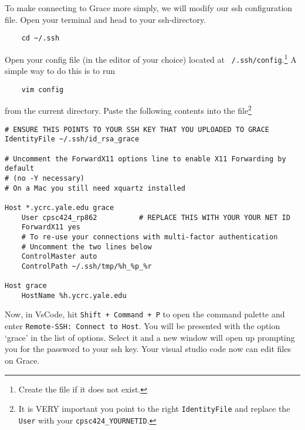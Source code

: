 \documentclass{article}
\begin{document}
To make connecting to Grace more simply, we will modify our ssh configuration file. 
Open your terminal and head to your ssh-directory.
\begin{verbatim}
    cd ~/.ssh
\end{verbatim}
Open your config file (in the editor of your choice) located at \texttt{~/.ssh/config}.\footnote{Create the file if it does not exist.}
A simple way to do this is to run 
\begin{verbatim}
    vim config
\end{verbatim}
from the current directory. Paste the following contents into the file\footnote{It is VERY important you point to the 
right \texttt{IdentityFile} and replace the \texttt{User} with your \texttt{cpsc424\_YOURNETID}.}
\begin{verbatim}
# ENSURE THIS POINTS TO YOUR SSH KEY THAT YOU UPLOADED TO GRACE
IdentityFile ~/.ssh/id_rsa_grace

# Uncomment the ForwardX11 options line to enable X11 Forwarding by default 
# (no -Y necessary)
# On a Mac you still need xquartz installed

Host *.ycrc.yale.edu grace
    User cpsc424_rp862          # REPLACE THIS WITH YOUR YOUR NET ID
    ForwardX11 yes
    # To re-use your connections with multi-factor authentication
    # Uncomment the two lines below
    ControlMaster auto
    ControlPath ~/.ssh/tmp/%h_%p_%r

Host grace
    HostName %h.ycrc.yale.edu
\end{verbatim}
Now, in VsCode, hit \texttt{Shift + Command + P} to open the command palette and enter \texttt{Remote-SSH: Connect to Host}. You will 
be presented with the option `grace' in the list of options. Select it and a new window will open up prompting you for the password to your ssh key. 
Your visual studio code now can edit files on Grace.
\end{document}
